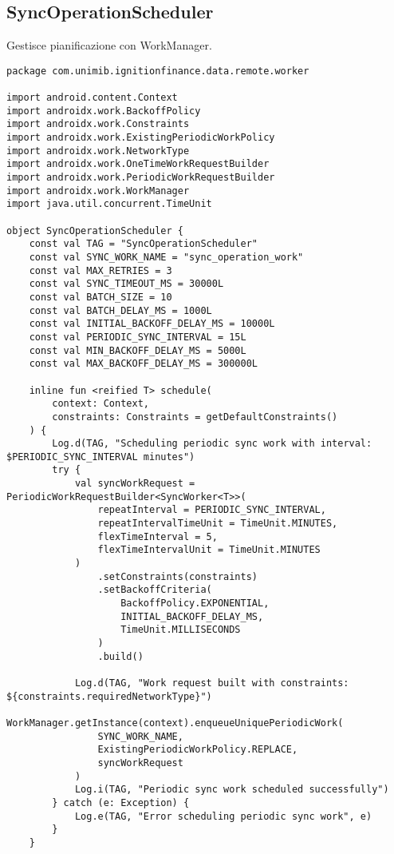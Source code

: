 \subsection{SyncOperationScheduler}\label{subsec:syncoperationscheduler} Gestisce pianificazione con WorkManager.

\begin{lstlisting}[caption=SyncOperationScheduler.kt, label=lst:syncoperationscheduler, basicstyle=\ttfamily\scriptsize, breaklines=true, breakatwhitespace=true, tabsize=4, backgroundcolor=\color{codegray}]
package com.unimib.ignitionfinance.data.remote.worker

import android.content.Context
import androidx.work.BackoffPolicy
import androidx.work.Constraints
import androidx.work.ExistingPeriodicWorkPolicy
import androidx.work.NetworkType
import androidx.work.OneTimeWorkRequestBuilder
import androidx.work.PeriodicWorkRequestBuilder
import androidx.work.WorkManager
import java.util.concurrent.TimeUnit

object SyncOperationScheduler {
    const val TAG = "SyncOperationScheduler"
    const val SYNC_WORK_NAME = "sync_operation_work"
    const val MAX_RETRIES = 3
    const val SYNC_TIMEOUT_MS = 30000L
    const val BATCH_SIZE = 10
    const val BATCH_DELAY_MS = 1000L
    const val INITIAL_BACKOFF_DELAY_MS = 10000L
    const val PERIODIC_SYNC_INTERVAL = 15L
    const val MIN_BACKOFF_DELAY_MS = 5000L
    const val MAX_BACKOFF_DELAY_MS = 300000L

    inline fun <reified T> schedule(
        context: Context,
        constraints: Constraints = getDefaultConstraints()
    ) {
        Log.d(TAG, "Scheduling periodic sync work with interval: $PERIODIC_SYNC_INTERVAL minutes")
        try {
            val syncWorkRequest = PeriodicWorkRequestBuilder<SyncWorker<T>>(
                repeatInterval = PERIODIC_SYNC_INTERVAL,
                repeatIntervalTimeUnit = TimeUnit.MINUTES,
                flexTimeInterval = 5,
                flexTimeIntervalUnit = TimeUnit.MINUTES
            )
                .setConstraints(constraints)
                .setBackoffCriteria(
                    BackoffPolicy.EXPONENTIAL,
                    INITIAL_BACKOFF_DELAY_MS,
                    TimeUnit.MILLISECONDS
                )
                .build()

            Log.d(TAG, "Work request built with constraints: ${constraints.requiredNetworkType}")
            WorkManager.getInstance(context).enqueueUniquePeriodicWork(
                SYNC_WORK_NAME,
                ExistingPeriodicWorkPolicy.REPLACE,
                syncWorkRequest
            )
            Log.i(TAG, "Periodic sync work scheduled successfully")
        } catch (e: Exception) {
            Log.e(TAG, "Error scheduling periodic sync work", e)
        }
    }


\end{lstlisting}

